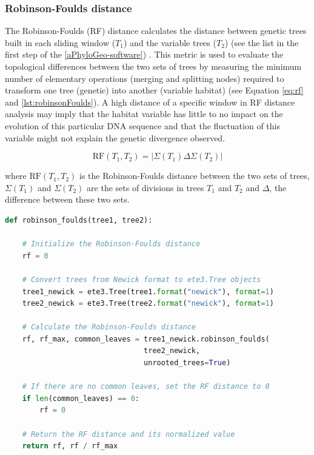 \subsubsection{Robinson-Foulds distance}\label{RF}
The Robinson-Foulds (RF) distance \citep{robinson_comparison_1981} calculates the distance between genetic trees built in each sliding window ($T_1$) and the variable trees ($T_2$) (see the list in the first step of the \autoref{aPhyloGeo-software}) \citep{tahiri2018new, li2024comparison}. This metric is used to evaluate the topological differences between the two sets of trees by measuring the minimum number of elementary operations (merging and splitting nodes) required to transform one tree (genetic) into another (variable habitat) (see Equation \eqref{eq:rf} and \autoref{lst:robinsonFoulds}). A high distance of a specific window in RF distance analysis may imply that the habitat variable has little to no impact on the evolution of this particular DNA sequence and that the fluctuation of this variable might not explain the genetic divergence observed.

\begin{equation}\label{eq:rf}
    \text{RF}(T_1, T_2) = | \Sigma(T_1) \Delta \Sigma(T_2) |
\end{equation}

where $\text{RF}(T_1, T_2)$ is the Robinson-Foulds distance between the two sets of trees, $\Sigma(T_1)$ and $\Sigma(T_2)$ are the sets of divisions in trees $T_1$ and $T_2$ and $ \Delta $, the difference between these two sets.

\begin{lstlisting}[label=lst:robinsonFoulds,language=Python,caption=Python script for calculating the Robinson-Foulds Distance using the ete3 package in the aPhyloGeo package. The Newick format represents the phylogenetic and variable trees in text form.]
def robinson_foulds(tree1, tree2):

    # Initialize the Robinson-Foulds distance
    rf = 0

    # Convert trees from Newick format to ete3.Tree objects
    tree1_newick = ete3.Tree(tree1.format("newick"), format=1)
    tree2_newick = ete3.Tree(tree2.format("newick"), format=1)

    # Calculate the Robinson-Foulds distance
    rf, rf_max, common_leaves = tree1_newick.robinson_foulds(
                                tree2_newick,
                                unrooted_trees=True)

    # If there are no common leaves, set the RF distance to 0
    if len(common_leaves) == 0:
        rf = 0

    # Return the RF distance and its normalized value
    return rf, rf / rf_max
\end{lstlisting}

